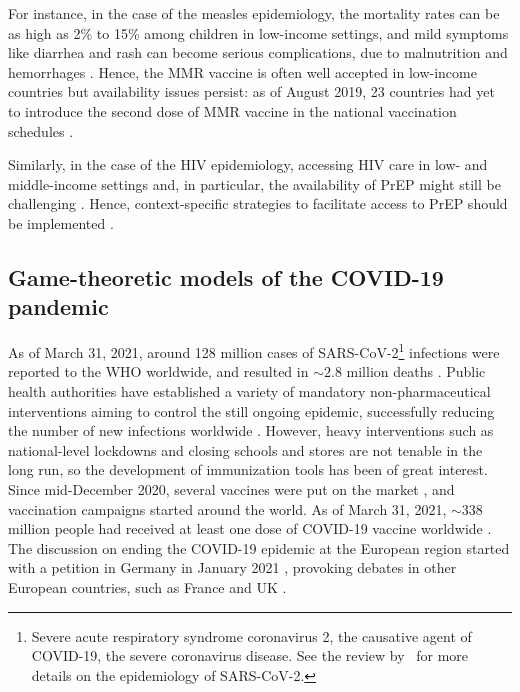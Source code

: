 For instance, in the case of the measles epidemiology, the mortality rates can be as high as 2\% to 15\% among children in low-income settings, and mild symptoms like diarrhea and rash can become serious complications, due to malnutrition and hemorrhages \cite[]{Sever2011}. Hence, the MMR vaccine is often well accepted in low-income countries \cite[]{Larson2016} but availability issues persist: as of August 2019, 23 countries had yet to introduce the second dose of MMR vaccine in the national vaccination schedules \cite[]{WHO_MeaslesWW2019}. 

Similarly, in the case of the HIV epidemiology, accessing HIV care in low- and middle-income settings and, in particular, the availability of PrEP might still be challenging \cite[]{UNAIDS_Data2019}. Hence, context-specific strategies to facilitate access to PrEP should be implemented \cite[]{Rebe2019}. 


\subsection{Game-theoretic models of the COVID-19 pandemic}

As of March 31, 2021, around 128 million cases of SARS-CoV-2\footnote{Severe acute respiratory syndrome coronavirus 2, the causative agent of COVID-19, the severe coronavirus disease. See the review by~\cite{Salzberger2020} for more details on the epidemiology of SARS-CoV-2.} infections were reported to the WHO worldwide, and resulted in $\sim2.8$ million deaths \cite[]{WHO_CovidDashboard}. Public health authorities have established a variety of mandatory non-pharmaceutical interventions aiming to control the still ongoing epidemic, successfully reducing the number of new infections worldwide \cite[]{Bo2021}. However, heavy interventions such as national-level lockdowns and closing schools and stores are not tenable in the long run, so the development of immunization tools has been of great interest. Since mid-December 2020, several vaccines were put on the market \cite[]{WHO_CovidVaccines}, and vaccination campaigns started around the world. As of March 31, 2021, $\sim338$ million people had received at least one dose of COVID-19 vaccine worldwide \cite[]{OWID_CovidVaccination}. The discussion on ending the COVID-19 epidemic at the European region started with a petition in Germany in January 2021 \cite[]{ZeroCovid_EU}, provoking debates in other European countries, such as France \cite[]{ZeroCovid_FR} and UK \cite[]{ZeroCovid_UK}. 


